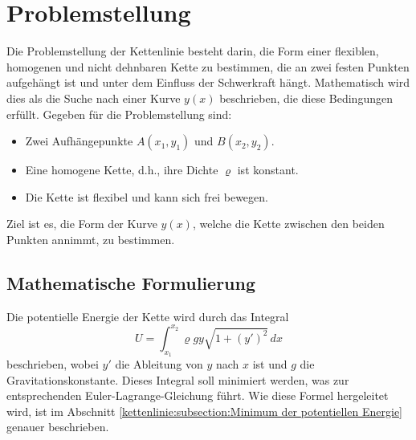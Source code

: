 %
%
%
%
\section{Problemstellung\label{kettenlinie:section:Problemstellung}}
Die Problemstellung der Kettenlinie besteht darin, die Form einer flexiblen, homogenen und nicht dehnbaren Kette zu bestimmen, die an zwei festen Punkten aufgehängt ist und unter dem Einfluss der Schwerkraft hängt.
Mathematisch wird dies als die Suche nach einer Kurve \( y(x) \) beschrieben, die diese Bedingungen erfüllt.
Gegeben für die Problemstellung sind: 
\begin{itemize}
\item
Zwei Aufhängepunkte \( A(x_1, y_1) \) und \( B(x_2, y_2) \).
\item
Eine homogene Kette, d.h., ihre Dichte \( \varrho \) ist konstant.
%
\item
Die Kette ist flexibel und kann sich frei bewegen.
\end{itemize}
Ziel ist es, die Form der Kurve \( y(x) \), welche die Kette zwischen den beiden Punkten annimmt, zu bestimmen.

\subsection{Mathematische Formulierung
\label{kettenlinie:subsection:Mathematische Formulierung}}
Die potentielle Energie der Kette wird durch das Integral
\begin{equation}
	U = \int_{x_1}^{x_2} \varrho g y \sqrt{1 + (y')^2} \, dx
\end{equation}
beschrieben, wobei \( y' \) die Ableitung von \( y \) nach \( x \) ist und \( g \) die Gravitationskonstante.
%
%
%
Dieses Integral soll minimiert werden, was zur entsprechenden Euler-Lagrange-Gleichung führt.
Wie diese Formel hergeleitet wird, ist im Abschnitt \ref{kettenlinie:subsection:Minimum der potentiellen Energie} genauer beschrieben.


